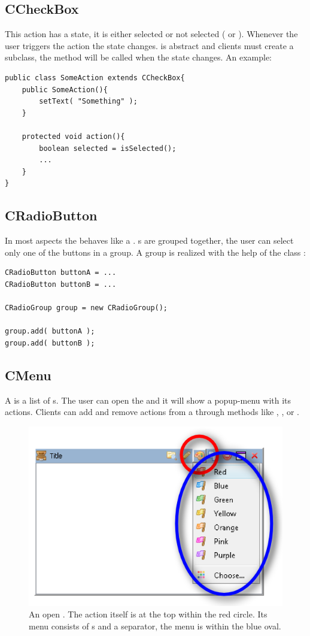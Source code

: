 \subsection{CCheckBox}
This action has a state, it is either selected or not selected ( or ). Whenever the user triggers the action the state changes.  is abstract and clients must create a subclass, the method  will be called when the state changes. An example:
\begin{lstlisting}
public class SomeAction extends CCheckBox{
	public SomeAction(){
		setText( "Something" );
	}
	
	protected void action(){
		boolean selected = isSelected();
		...
	}
}
\end{lstlisting}

\subsection{CRadioButton}
In most aspects the  behaves like a . s are grouped together, the user can select only one of the buttons in a group. A group is realized with the help of the class :
\begin{lstlisting}
CRadioButton buttonA = ...
CRadioButton buttonB = ...

CRadioGroup group = new CRadioGroup();

group.add( buttonA );
group.add( buttonB );
\end{lstlisting}

\subsection{CMenu}
A  is a list of s. The user can open the  and it will show a popup-menu with its actions. Clients can add and remove actions from a  through methods like , , or .

\begin{figure}[ht]
\centering
\includegraphics[scale=0.75]{actions/cmenu}
\caption{An open . The action itself is at the top within the red circle. Its menu consists of s and a separator, the menu is within the blue oval.}
\label{fig:cmenu}
\end{figure}

